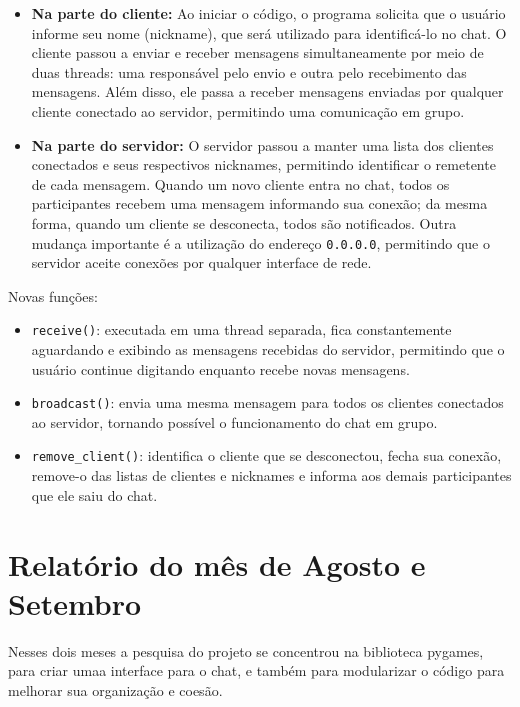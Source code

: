 	\begin{itemize}
		\item \textbf{Na parte do cliente:} Ao iniciar o código, o programa solicita que o usuário informe seu nome (nickname), que será utilizado para identificá-lo no chat. O cliente passou a enviar e receber mensagens simultaneamente por meio de duas threads: uma responsável pelo envio e outra pelo recebimento das mensagens. Além disso, ele passa a receber mensagens enviadas por qualquer cliente conectado ao servidor, permitindo uma comunicação em grupo.
		
		\item \textbf{Na parte do servidor:} O servidor passou a manter uma lista dos clientes conectados e seus respectivos nicknames, permitindo identificar o remetente de cada mensagem. Quando um novo cliente entra no chat, todos os participantes recebem uma mensagem informando sua conexão; da mesma forma, quando um cliente se desconecta, todos são notificados. Outra mudança importante é a utilização do endereço \verb|0.0.0.0|, permitindo que o servidor aceite conexões por qualquer interface de rede.
	\end{itemize}
	
	Novas funções:
	
	\begin{itemize}
		\item \verb|receive()|: executada em uma thread separada, fica constantemente aguardando e exibindo as mensagens recebidas do servidor, permitindo que o usuário continue digitando enquanto recebe novas mensagens.
		
		\item \verb|broadcast()|: envia uma mesma mensagem para todos os clientes conectados ao servidor, tornando possível o funcionamento do chat em grupo.
		
		\item \verb|remove_client()|: identifica o cliente que se desconectou, fecha sua conexão, remove-o das listas de clientes e nicknames e informa aos demais participantes que ele saiu do chat.
	\end{itemize}
	
	
	
	
	\section{Relatório do mês de Agosto e Setembro}
	
	Nesses dois meses a pesquisa do projeto se concentrou na biblioteca pygames, para criar umaa interface para o chat, e também para modularizar o código para melhorar sua organização e coesão.
	
